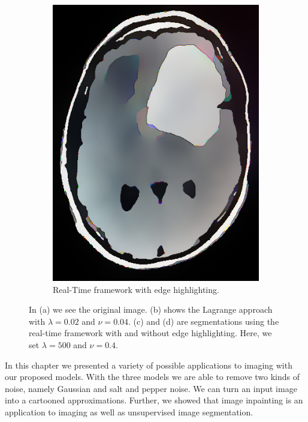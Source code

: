 \documentclass[abstracton]{scrreprt}
\begin{document}
\begin{figure}[!ht]
\begin{subfigure}[b]{0.33\textwidth}
                    \includegraphics[width=\textwidth]{img/segmentation/rt/keating_eh.png}
                    \caption{Real-Time framework with edge highlighting.}
                \end{subfigure}
                \caption[Image segmentation for a brain tumor image.]{In (a) we see the original image. (b) shows the Lagrange approach with $\lambda = 0.02$ and $\nu = 0.04$. (c) and (d) are segmentations using the real-time framework with and without edge highlighting. Here, we set $\lambda = 500$ and $\nu = 0.4$.}
            \label{fig:segmentation_evolution_keating}
            \end{figure}

    In this chapter we presented a variety of possible applications to imaging with our proposed models. With the three models we are able to remove two kinds of noise, namely Gaussian and salt and pepper noise. We can turn an input image into a cartooned approximations. Further, we showed that image inpainting is an application to imaging as well as unsupervised image segmentation.
\end{document}
